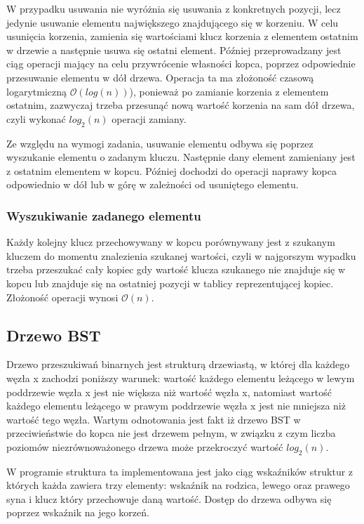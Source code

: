 \documentclass{article}
\begin{document}
W przypadku usuwania nie wyróżnia się usuwania z konkretnych pozycji, lecz jedynie usuwanie elementu największego znajdującego się w korzeniu. W celu usunięcia korzenia, zamienia się wartościami klucz korzenia z elementem ostatnim w drzewie a następnie usuwa się ostatni element. Później przeprowadzany jest ciąg operacji mający na celu przywrócenie własności kopca, poprzez \linebreak odpowiednie przesuwanie elementu w dół drzewa.
Operacja ta ma złożoność czasową logarytmiczną $\mathcal{O}(log(n))$), ponieważ po zamianie korzenia z elementem ostatnim, zazwyczaj trzeba przesunąć nową wartość korzenia na sam dół drzewa, czyli wykonać $log_2(n)$ operacji zamiany.

Ze względu na wymogi zadania, usuwanie elementu odbywa się poprzez wyszukanie elementu o zadanym kluczu. Następnie dany element zamieniany jest z ostatnim elementem w kopcu. Później dochodzi do operacji naprawy kopca odpowiednio w dół lub w górę w zależności od usuniętego elementu. 
 
\subsubsection{Wyszukiwanie zadanego elementu} 

Każdy kolejny klucz przechowywany w kopcu porównywany jest z szukanym kluczem do momentu znalezienia szukanej wartości, czyli w najgorszym wypadku trzeba przeszukać cały kopiec gdy wartość klucza szukanego nie znajduje się w kopcu lub znajduje się na ostatniej pozycji w tablicy reprezentującej kopiec.
Złożoność operacji wynosi $\mathcal{O}(n)$.
 
\subsection{Drzewo BST}

Drzewo przeszukiwań binarnych jest strukturą drzewiastą, w której dla każdego węzła x zachodzi poniższy warunek:
wartość każdego elementu leżącego w lewym poddrzewie węzła x jest nie większa niż wartość węzła x, natomiast wartość każdego elementu leżącego w prawym poddrzewie węzła x jest nie mniejsza niż wartość tego węzła. Wartym odnotowania jest fakt iż drzewo BST w przeciwieństwie do kopca nie jest drzewem pełnym, w związku z czym liczba poziomów niezrównoważonego drzewa może przekroczyć wartość $log_2(n)$.

W programie struktura ta implementowana jest jako ciąg wskaźników struktur z których każda zawiera trzy elementy:
wskaźnik na rodzica, lewego oraz prawego syna i klucz który przechowuje daną wartość. Dostęp do drzewa odbywa się poprzez wskaźnik na jego korzeń.
\end{document}
